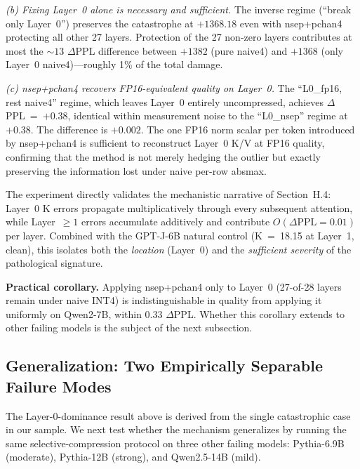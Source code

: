 \documentclass[11pt]{article}
\begin{document}
\emph{(b) Fixing Layer~0 alone is necessary and sufficient.} The inverse regime (``break only Layer~0'') preserves the catastrophe at $+1368.18$ even with nsep+pchan4 protecting all other 27 layers. Protection of the 27 non-zero layers contributes at most the $\sim 13$ $\Delta$PPL difference between $+1382$ (pure naive4) and $+1368$ (only Layer~0 naive4)---roughly 1\% of the total damage.

\emph{(c) nsep+pchan4 recovers FP16-equivalent quality on Layer~0.} The ``L0\_fp16, rest naive4'' regime, which leaves Layer~0 entirely uncompressed, achieves $\Delta$PPL~=~$+0.38$, identical within measurement noise to the ``L0\_nsep'' regime at $+0.38$. The difference is $+0.002$. The one FP16 norm scalar per token introduced by nsep+pchan4 is sufficient to reconstruct Layer~0 K/V at FP16 quality, confirming that the method is not merely hedging the outlier but exactly preserving the information lost under naive per-row absmax.

The experiment directly validates the mechanistic narrative of Section~H.4: Layer~0 K errors propagate multiplicatively through every subsequent attention, while Layer~$\ge 1$ errors accumulate additively and contribute $O(\Delta\text{PPL}=0.01)$ per layer. Combined with the GPT-J-6B natural control (K~=~18.15 at Layer~1, clean), this isolates both the \emph{location} (Layer~0) and the \emph{sufficient severity} of the pathological signature.

\textbf{Practical corollary.} Applying nsep+pchan4 only to Layer~0 (27-of-28 layers remain under naive INT4) is indistinguishable in quality from applying it uniformly on Qwen2-7B, within 0.33 $\Delta$PPL. Whether this corollary extends to other failing models is the subject of the next subsection.

\subsection{Generalization: Two Empirically Separable Failure Modes}
\label{sec:two_modes}

The Layer-0-dominance result above is derived from the single catastrophic case in our sample. We next test whether the mechanism generalizes by running the same selective-compression protocol on three other failing models: Pythia-6.9B (moderate), Pythia-12B (strong), and Qwen2.5-14B (mild).
\end{document}
